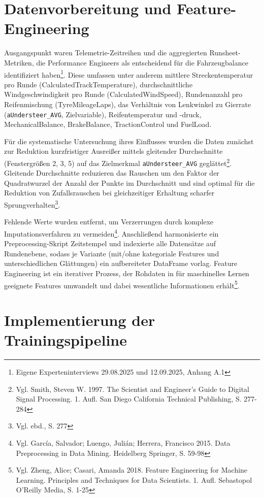 \section{Datenvorbereitung und Feature-Engineering}

Ausgangspunkt waren Telemetrie-Zeitreihen und die aggregierten Runsheet-Metriken, die Performance Engineers als entscheidend für die Fahrzeugbalance identifiziert haben\footnote{Eigene Experteninterviews 29.08.2025 und 12.09.2025, Anhang A.1}. Diese umfassen unter anderem mittlere Streckentemperatur pro Runde (CalculatedTrackTemperature), durchschnittliche Windgeschwindigkeit pro Runde (CalculatedWindSpeed), Rundenanzahl pro Reifenmischung (TyreMileageLaps), das Verhältnis von Lenkwinkel zu Gierrate (\texttt{aUndersteer\_AVG}, Zielvariable), Reifentemperatur und -druck, MechanicalBalance, BrakeBalance, TractionControl und FuelLoad.

Für die systematische Untersuchung ihres Einflusses wurden die Daten zunächst zur Reduktion kurzfristiger Ausreißer mittels gleitender Durchschnitte (Fenstergrößen 2, 3, 5) auf das Zielmerkmal \texttt{aUndersteer\_AVG} geglättet\footnote{Vgl. Smith, Steven W. 1997. The Scientist and Engineer's Guide to Digital Signal Processing. 1. Aufl. San Diego California Technical Publishing, S. 277-284}. Gleitende Durchschnitte reduzieren das Rauschen um den Faktor der Quadratwurzel der Anzahl der Punkte im Durchschnitt und sind optimal für die Reduktion von Zufallsrauschen bei gleichzeitiger Erhaltung scharfer Sprungverhalten\footnote{Vgl. ebd., S. 277}. 

Fehlende Werte wurden entfernt, um Verzerrungen durch komplexe Imputationsverfahren zu vermeiden\footnote{Vgl. García, Salvador; Luengo, Julián; Herrera, Francisco 2015. Data Preprocessing in Data Mining. Heidelberg Springer, S. 59-98}. Anschließend harmonisierte ein Preprocessing-Skript Zeitstempel und indexierte alle Datensätze auf Rundenebene, sodass je Variante (mit/ohne kategoriale Features und unterschiedlichen Glättungen) ein aufbereiteter DataFrame vorlag. Feature Engineering ist ein iterativer Prozess, der Rohdaten in für maschinelles Lernen geeignete Features umwandelt und dabei wesentliche Informationen erhält\footnote{Vgl. Zheng, Alice; Casari, Amanda 2018. Feature Engineering for Machine Learning. Principles and Techniques for Data Scientists. 1. Aufl. Sebastopol O'Reilly Media, S. 1-25}.

\section{Implementierung der Trainingspipeline}

